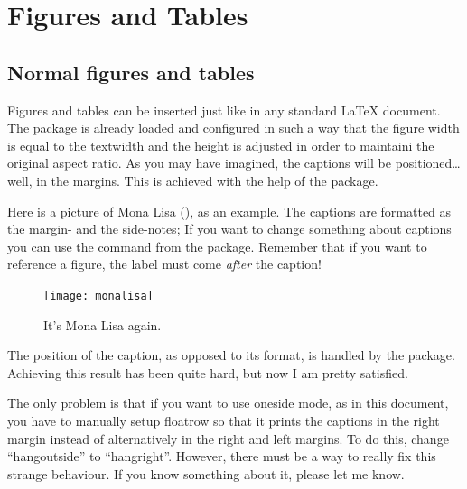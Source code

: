\setchapterpreamble[u]{\margintoc}
\chapter{Figures and Tables\footnotemark[0]}


\section{Normal figures and tables}

Figures and tables can be inserted just like in any standard 
\LaTeX\xspace document. The  package is already loaded 
and configured in such a way that the figure width is equal to the 
textwidth and the height is adjusted in order to maintaini the original 
aspect ratio. As you may have imagined, the captions will be 
positioned\ldots well, in the margins. This is achieved with the help of 
the  package.

Here is a picture of Mona Lisa (), as an example. 
The captions are formatted as the margin- and the side-notes; If you 
want to change something about captions you can use the command 
 from the  package. Remember that if 
you want to reference a figure, the label must come \emph{after} the 
caption!

\begin{figure}[hb]
	\texttt{[image: monalisa]}
	\caption[Mona Lisa, again]{It's Mona Lisa again. \blindtext}
\end{figure}

The position of the caption, as opposed to its format, is handled by the 
 package. Achieving this result has been quite hard, 
but now I am pretty satisfied.

\begin{kaobox}[frametitle=To Do]
The only problem is that if you want to use oneside mode, as in this 
document, you have to manually setup floatrow so that it prints the 
captions in the right margin instead of alternatively in the right and 
left margins. To do this, change \enquote{hangoutside} to 
\enquote{hangright}. However, there must be a way to really fix this 
strange behaviour. If you know something about it, please let me know.
\end{kaobox}

